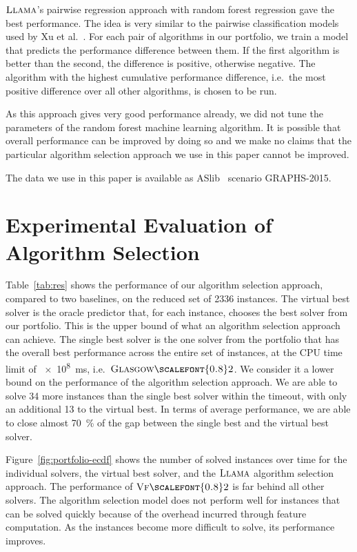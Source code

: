 \documentclass{llncs}
\newcommand{\VFtwo}{$\textsc{Vf{\scalefont{0.8}2}}$\xspace}
\newcommand{\GlasgowTwo}{$\textsc{Glasgow{\scalefont{0.8}2}}$\xspace}
\newcommand{\LLAMA}{$\textsc{Llama}$\xspace}
\begin{document}
\LLAMA's pairwise regression approach with random forest regression gave the best performance. The
idea is very similar to the pairwise classification models used by Xu et al.~\cite{xu_satzilla_2008}. For
each pair of algorithms in our portfolio, we train a model that predicts the performance difference
between them. If the first algorithm is better than the second, the difference is positive,
otherwise negative. The algorithm with the highest cumulative performance difference, i.e.\ the most
positive difference over all other algorithms, is chosen to be run.

As this approach gives very good performance already, we did not tune the parameters of the random
forest machine learning algorithm. It is possible that overall performance can be improved by doing
so and we make no claims that the particular algorithm selection approach we use in this paper
cannot be improved.

The data we use in this paper is available as ASlib~\cite{aslib} scenario GRAPHS-2015.

\section{Experimental Evaluation of Algorithm Selection}\label{sec:algsel-exps}

Table~\ref{tab:res} shows the performance of our algorithm selection approach, compared to two
baselines, on the reduced set of 2336 instances. The virtual best solver is the oracle predictor
that, for each instance, chooses the best solver from our portfolio. This is the upper bound of what
an algorithm selection approach can achieve. The single best solver is the one solver from the
portfolio that has the overall best performance across the entire set of instances, at the CPU time
limit of \SI{e8}{\ms}, i.e.\ \GlasgowTwo. We consider it a lower bound on the performance of the
algorithm selection approach.  We are able to solve 34 more instances than the single best solver
within the timeout, with only an additional 13 to the virtual best. In terms of average performance,
we are able to close almost \SI{70}{\percent} of the gap between the single best and the virtual
best solver.

Figure~\ref{fig:portfolio-ecdf} shows the number of solved instances over time for the individual
solvers, the virtual best solver, and the \LLAMA algorithm selection approach. The performance of
\VFtwo is far behind all other solvers.  The algorithm selection model does not perform well for
instances that can be solved quickly because of the overhead incurred through feature computation.
As the instances become more difficult to solve, its performance improves.
\end{document}
